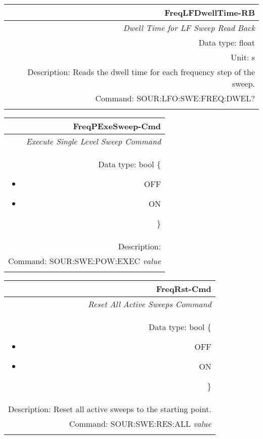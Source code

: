 \documentclass[openany]{article}
\begin{document}
		\begin{tabular}{N}
			\hline
			\bfseries FreqLFDwellTime-RB \\ \hline
			\emph{Dwell Time for LF Sweep Read Back} \\
			Data type: float \\
			Unit: s \\
			Description: Reads the dwell time for each frequency step of the sweep. \\
			Command: SOUR:LFO:SWE:FREQ:DWEL? \\
			\\

		\end{tabular}


		\begin{tabular}{N}
			\hline
			\bfseries FreqPExeSweep-Cmd \\ \hline
			\emph{Execute Single Level Sweep Command} \\
			Data type: bool \{\begin{itemize}[noitemsep]
				\small
				\item[] OFF
				\item[] ON
			\end{itemize}\} \\
			Description:  \\
			Command: SOUR:SWE:POW:EXEC \emph{value} \\
			\\

		\end{tabular}


		\begin{tabular}{N}
			\hline
			\bfseries FreqRst-Cmd \\ \hline
			\emph{Reset All Active Sweeps Command} \\
			Data type: bool \{\begin{itemize}[noitemsep]
				\small
				\item[] OFF
				\item[] ON
			\end{itemize}\} \\
			Description: Reset all active sweeps to the starting point. \\
			Command: SOUR:SWE:RES:ALL \emph{value} \\
			\\

		\end{tabular}



\end{document}

